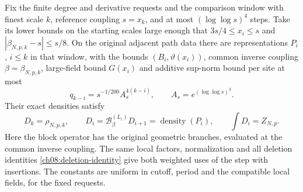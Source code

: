 \begin{proposition}
\label{ch11:restart-family}
Fix the finite degree and derivative requests and the comparison
window with finest scale $k$, reference coupling $s=x_k$, and at most
$(\log\log s)^4$ steps. Take its lower bounds on the starting scales large enough
that $3s/4\le x_i\le s$ and
$|\beta_{N,p,k}-s|\le s/8$. On the original adjacent path data there
are representations $P_i$, $i\le k$ in that window, with the bounds
$(B_i,\vartheta(x_i))$, common inverse coupling
$\beta=\beta_{N,p,k}$, large-field bound $G(x_i)$ and additive
sup-norm bound per site at most
\[
 q_{k-i}=s^{-1/200}A_s^{4(k-i)},\qquad
                    A_s=e^{(\log\log s)^3}.
\]
Their exact densities satisfy
\begin{equation}
 D_k=\rho_{N,p,k},\qquad
 D_i=\mathcal B^{(L_i)}_\beta D_{i+1}=\operatorname{density}(P_i),
 \qquad \int D_i=Z_{N,p}.
 \label{ch11:restart-density}
\end{equation}
Here the block operator has the original geometric branches, evaluated
at the common inverse coupling. The same local factors, normalization and
all deletion identities \eqref{ch08:deletion-identity} give both weighted uses of the
step with insertions. The constants are uniform in cutoff, period and the compatible
local fields, for the fixed requests.
\end{proposition}

